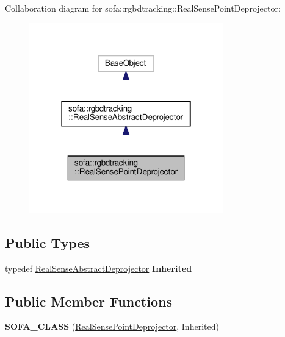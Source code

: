 Collaboration diagram for sofa\+:\+:rgbdtracking\+:\+:Real\+Sense\+Point\+Deprojector\+:\nopagebreak
\begin{figure}[H]
\begin{center}
\leavevmode
\includegraphics[width=238pt]{classsofa_1_1rgbdtracking_1_1_real_sense_point_deprojector__coll__graph}
\end{center}
\end{figure}
\subsection*{Public Types}
\begin{DoxyCompactItemize}
\item 
\mbox{\label{classsofa_1_1rgbdtracking_1_1_real_sense_point_deprojector_a06e1fe2c0a7478ad85adf5d3add317f2}} 
typedef \hyperlink{classsofa_1_1rgbdtracking_1_1_real_sense_abstract_deprojector}{Real\+Sense\+Abstract\+Deprojector} {\bfseries Inherited}
\end{DoxyCompactItemize}
\subsection*{Public Member Functions}
\begin{DoxyCompactItemize}
\item 
\mbox{\label{classsofa_1_1rgbdtracking_1_1_real_sense_point_deprojector_ac58e605830c9aec518aab80a94dbea3d}} 
{\bfseries S\+O\+F\+A\+\_\+\+C\+L\+A\+SS} (\hyperlink{classsofa_1_1rgbdtracking_1_1_real_sense_point_deprojector}{Real\+Sense\+Point\+Deprojector}, Inherited)
\end{DoxyCompactItemize}
